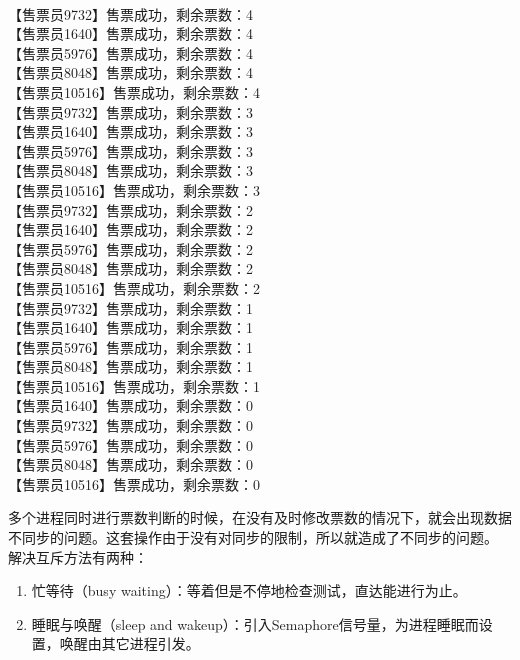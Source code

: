 \begin{tcolorbox}
	 \\
	【售票员9732】售票成功，剩余票数：4 \\
	【售票员1640】售票成功，剩余票数：4 \\
	【售票员5976】售票成功，剩余票数：4 \\
	【售票员8048】售票成功，剩余票数：4 \\
	【售票员10516】售票成功，剩余票数：4 \\
	【售票员9732】售票成功，剩余票数：3 \\
	【售票员1640】售票成功，剩余票数：3 \\
	【售票员5976】售票成功，剩余票数：3 \\
	【售票员8048】售票成功，剩余票数：3 \\
	【售票员10516】售票成功，剩余票数：3 \\
	【售票员9732】售票成功，剩余票数：2  \\
	【售票员1640】售票成功，剩余票数：2  \\
	【售票员5976】售票成功，剩余票数：2  \\
	【售票员8048】售票成功，剩余票数：2  \\
	【售票员10516】售票成功，剩余票数：2 \\
	【售票员9732】售票成功，剩余票数：1 \\
	【售票员1640】售票成功，剩余票数：1 \\
	【售票员5976】售票成功，剩余票数：1 \\
	【售票员8048】售票成功，剩余票数：1 \\
	【售票员10516】售票成功，剩余票数：1 \\
	【售票员1640】售票成功，剩余票数：0 \\
	【售票员9732】售票成功，剩余票数：0 \\
	【售票员5976】售票成功，剩余票数：0 \\
	【售票员8048】售票成功，剩余票数：0 \\
	【售票员10516】售票成功，剩余票数：0
\end{tcolorbox}

多个进程同时进行票数判断的时候，在没有及时修改票数的情况下，就会出现数据不同步的问题。这套操作由于没有对同步的限制，所以就造成了不同步的问题。 \\

解决互斥方法有两种：

\begin{enumerate}
	\item 忙等待（busy waiting）：等着但是不停地检查测试，直达能进行为止。
	
	\item 睡眠与唤醒（sleep and wakeup）：引入Semaphore信号量，为进程睡眠而设置，唤醒由其它进程引发。
\end{enumerate}

